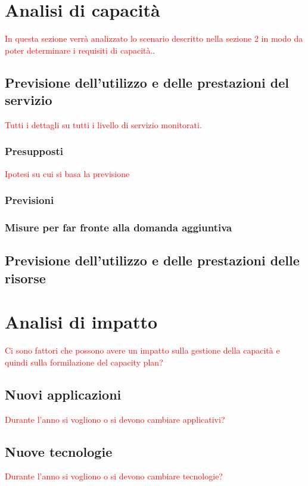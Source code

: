 \newpage
\section{Analisi di capacità}

	\textcolor{red}{In questa sezione verrà analizzato lo scenario descritto nella sezione 2 in modo da poter determinare i requisiti di capacità.}.


\subsection{Previsione dell'utilizzo e delle prestazioni del servizio}
	\textcolor{red}{	Tutti i dettagli su tutti i livello di servizio monitorati.}
	
	\subsubsection{Presupposti}
	\textcolor{red}{Ipotesi su cui si basa la previsione }
	\subsubsection{Previsioni}
	\textcolor{red}{}
	\subsubsection{Misure per far fronte alla domanda aggiuntiva}
	
	
\subsection{Previsione dell'utilizzo e delle prestazioni delle risorse}


\newpage
\section{Analisi di impatto}
	\textcolor{red}{Ci sono fattori che possono avere un impatto sulla gestione della capacità e quindi sulla formilazione del capacity plan? }
	\subsection{Nuovi applicazioni}
	\textcolor{red}{Durante l'anno si vogliono o si devono cambiare applicativi?}
	\subsection{Nuove tecnologie}
	\textcolor{red}{Durante l'anno si vogliono o si devono cambiare tecnologie?}
